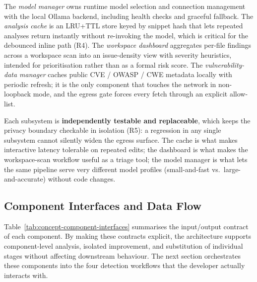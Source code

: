 The \emph{model manager} owns runtime model selection and connection management with the local Ollama backend, including health checks and graceful fallback. The \emph{analysis cache} is an LRU+TTL store keyed by snippet hash that lets repeated analyses return instantly without re-invoking the model, which is critical for the debounced inline path (R4). The \emph{workspace dashboard} aggregates per-file findings across a workspace scan into an issue-density view with severity heuristics, intended for prioritisation rather than as a formal risk score. The \emph{vulnerability-data manager} caches public CVE / OWASP / CWE metadata locally with periodic refresh; it is the only component that touches the network in non-loopback mode, and the egress gate forces every fetch through an explicit allow-list.

Each subsystem is \textbf{independently testable and replaceable}, which keeps the privacy boundary checkable in isolation (R5): a regression in any single subsystem cannot silently widen the egress surface. The cache is what makes interactive latency tolerable on repeated edits; the dashboard is what makes the workspace-scan workflow useful as a triage tool; the model manager is what lets the same pipeline serve very different model profiles (small-and-fast vs.\ large-and-accurate) without code changes.

\subsection{Component Interfaces and Data Flow}
\label{subsec:component-interfaces}

Table~\ref{tab:concept-component-interfaces} summarises the input/output contract of each component. By making these contracts explicit, the architecture supports component-level analysis, isolated improvement, and substitution of individual stages without affecting downstream behaviour. The next section orchestrates these components into the four detection workflows that the developer actually interacts with.

